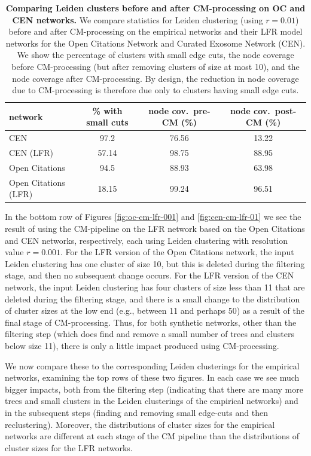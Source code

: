 \documentclass[11pt]{article}   	%
\begin{document}
\begin{table}[ht]
\centering
\begin{tabular}{lccc}
  \hline
 network & \% with small cuts & node cov.~pre-CM (\%) & node cov.~post-CM (\%) \\
   \hline
   CEN  &97.2 &76.56 &13.22 \\
   CEN (LFR) & 57.14& 98.75 & 88.95\\
   \hline
   Open Citations  &94.5&88.93&63.98 \\
   Open Citations (LFR) &18.15&99.24&96.51\\
   \hline
\end{tabular}
\caption{\textbf{Comparing Leiden clusters before and after CM-processing  on   OC and CEN networks.} We compare statistics for Leiden clustering (using $r=0.01$) before and after CM-processing on the empirical networks and their LFR model
networks for the Open Citations Network and Curated Exosome Network (CEN). We show the percentage of clusters with small edge cuts, the node coverage before CM-processing (but after removing clusters of size at most 10), and the node coverage
after CM-processing.  By design, the reduction in node coverage due to CM-processing  is therefore due only to clusters having small edge cuts.}
\label{tab:LFR-vs-empirical-OC-CEN}
\end{table}

In the bottom row of Figures \ref{fig:oc-cm-lfr-001} and  \ref{fig:cen-cm-lfr-01} we see the result of using the CM-pipeline on the LFR network based on the Open Citations  and CEN networks, respectively, each using Leiden clustering with
resolution value $r=0.001$.
For the LFR version of the Open Citations network, the input Leiden clustering has one cluster of size 10, but this is deleted during the filtering stage, and then no subsequent change occurs.
For the LFR version of the CEN network, the input Leiden clustering has four clusters of size less than 11 that are  deleted during the filtering stage, and there is a small change to the distribution of cluster sizes at the low end (e.g., between 11 and perhaps 50) as a result of the final stage of CM-processing.
Thus, for both synthetic networks, other than the filtering step (which does find and remove a small number of trees and clusters below size 11), there is only a little
impact produced using CM-processing.

We now compare these to the corresponding Leiden clusterings for the empirical networks, examining the top rows of these two figures.
In each case we see much bigger impacts, both from the filtering step (indicating that there are many more  trees and small clusters in the Leiden clusterings of the empirical
networks) and in the subsequent steps (finding and removing small edge-cuts and then reclustering).
Moreover, the distributions of cluster sizes for the empirical networks are different at each stage of the CM pipeline than the distributions of cluster sizes for the LFR networks.
\end{document}
